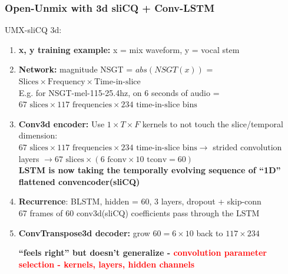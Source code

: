 \documentclass[usenames,dvipsnames]{beamer}
\begin{document}
\begin{frame}
	\frametitle{Open-Unmix with 3d sliCQ + Conv-LSTM}
	UMX-sliCQ 3d:
	\begin{enumerate}
		\item
			\textbf{x, y training example:} x = mix waveform, y = vocal stem
		\item
			\textbf{Network:} magnitude NSGT = $abs(NSGT(x))$ = $\text{Slices} \times \text{Frequency} \times \text{Time-in-slice}$\\E.g. for NSGT-mel-115-25.4hz, on 6 seconds of audio = $67 \text{ slices} \times 117 \text{ frequencies} \times 234 \text{ time-in-slice bins} $
		\item
			\textbf{Conv3d encoder:} Use $1 \times T \times F$ kernels to not touch the slice/temporal dimension:\\
			$67 \text{ slices} \times 117 \text{ frequencies} \times 234 \text{ time-in-slice bins} \rightarrow$ strided convolution layers $\rightarrow 67 \text{ slices} \times (6 \text { fconv} \times 10 \text { tconv} = 60)$\\
			\textbf{LSTM is now taking the temporally evolving sequence of ``1D'' flattened convencoder(sliCQ)}
		\item
			\textbf{Recurrence}: BLSTM, hidden = 60, 3 layers, dropout + skip-conn\\
			67 frames of 60 conv3d(sliCQ) coefficients pass through the LSTM
		\item
			\textbf{ConvTranspose3d decoder:} grow $60 = 6 \times 10$ back to $117 \times 234$

			\textbf{``feels right'' but doesn't generalize - \textcolor{red}{convolution parameter selection - kernels, layers, hidden channels}}
	\end{enumerate}
\end{frame}
\end{document}
